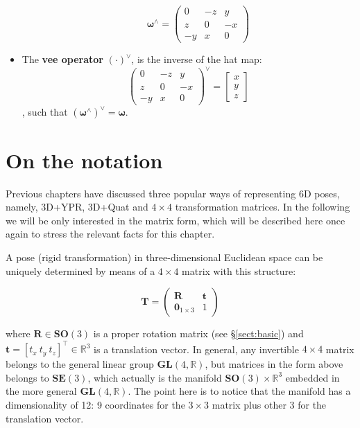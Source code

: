 \documentclass[a4paper,11pt]{report}
\begin{document}
\begin{itemize}
{\begin{equation}
	\quad \quad
	{\bm{\omega}}^\wedge
	=
	\left(
	\begin{array}{ccc}
	0 & -z & y  \\
	z & 0 & -x  \\
	-y & x & 0
	\end{array}
	\right)
	\end{equation}
}
\item{The \textbf{vee operator} $(\cdot)^{\vee}$, is the inverse of the hat map:
	\begin{equation}
	\label{eq:inv.skew}
	\left(
	\begin{array}{ccc}
	0 & -z & y  \\
	z & 0 & -x  \\
	-y & x & 0
	\end{array}
	\right)
	^{\vee}
	=
	\left[ \begin{array}{c} x \\ y \\z \end{array} \right]
	\end{equation}
	\noindent, such that $({\bm{\omega}}^\wedge)^\vee = \bm{\omega}$.
}
\end{itemize}



\section{On the notation}
\label{sect:mat_deriv:not}

Previous chapters have discussed three popular ways of representing 6D poses,
namely, 3D+YPR, 3D+Quat and $4\times 4$ transformation matrices.
In the following we will be only interested in the matrix form, which will be
described here once again to stress the relevant facts for this chapter.

A pose (rigid transformation) in three-dimensional Euclidean space can be uniquely determined by means
of a $4 \times 4$ matrix with this structure:

\begin{equation}
\label{eq:T_Rt}
 \mathbf{T} =
\left(
\begin{array}{c|c}
  \mathbf{R} & \mathbf{t} \\
\hline
  \mathbf{0}_{1\times 3} & 1
\end{array}
\right)
\end{equation}

\noindent where $\mathbf{R} \in \mathbf{SO}(3)$
is a proper rotation matrix (see \S\ref{sect:basic}) and $\mathbf{t}=[t_x ~ t_y ~ t_z]^\top \in \mathbb{R}^3$ is a translation vector.
In general, any invertible $4 \times 4$ matrix belongs to the
general linear group $\mathbf{GL}(4,\mathbb{R})$, but
matrices in the form above belongs to $\mathbf{SE}(3)$,
which actually is the manifold $\mathbf{SO}(3) \times \mathbb{R}^3$
embedded in the more general $\mathbf{GL}(4,\mathbb{R})$.
The point here is to notice that the manifold has a dimensionality of 12:
9 coordinates for the $3\times 3$ matrix plus other 3 for the translation vector.
\end{document}
